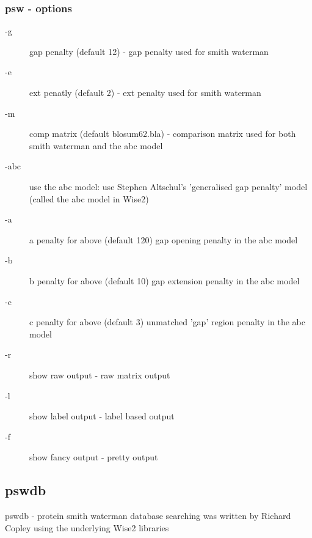 \documentclass{article}
\begin{document}
\subsubsection{psw - options}
\begin{description}
\item[-g] gap penalty (default 12) - gap penalty used for smith waterman
\item[-e] ext penatly (default 2) - ext penalty used for smith waterman
\item[-m] comp matrix (default blosum62.bla) - comparison matrix used for
both smith waterman and the abc model
\item[-abc] use the abc model: use Stephen Altschul's 'generalised gap penalty'
model (called the abc model in Wise2)
\item[-a]   a penalty for above (default 120) gap opening penalty in the abc model
\item[-b]   b penalty for above (default 10) gap extension penalty in the abc model
\item[-c]   c penalty for above (default 3) unmatched 'gap' region penalty in the abc model
\item[-r] show raw output - raw matrix output
\item[-l] show label output - label based output
\item[-f] show fancy output - pretty output
\end{description}

\subsection{pswdb}

pswdb - protein smith waterman database searching was written by Richard Copley using
the underlying Wise2 libraries
\end{document}
